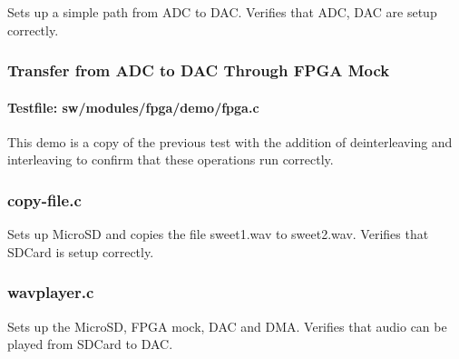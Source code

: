 Sets up a simple path from ADC to DAC. Verifies that ADC, DAC are
setup correctly.

\subsubsection{Transfer from ADC to DAC Through FPGA Mock}
\paragraph{Testfile: sw/modules/fpga/demo/fpga.c}

This demo is a copy of the previous test with the addition of deinterleaving and
interleaving to confirm that these operations run correctly.

\subsubsection{copy-file.c}
Sets up MicroSD and copies the file sweet1.wav to sweet2.wav. Verifies that
SDCard is setup correctly.

\subsubsection{wavplayer.c}
Sets up the MicroSD, FPGA mock, DAC and DMA. Verifies that audio can be played
from SDCard to DAC.

